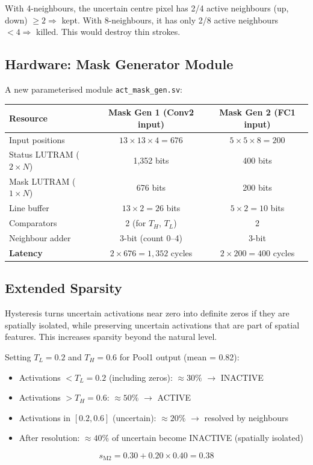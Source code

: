 \documentclass[11pt,a4paper]{article}
\begin{document}
With 4-neighbours, the uncertain centre pixel has 2/4 active neighbours
(up, down) $\geq 2 \Rightarrow$ kept. With 8-neighbours, it has only 2/8
active neighbours $< 4 \Rightarrow$ killed. This would destroy thin strokes.

\subsection{Hardware: Mask Generator Module}

A new parameterised module \texttt{act\_mask\_gen.sv}:

\begin{center}
\begin{tabular}{lcc}
\toprule
\textbf{Resource} & \textbf{Mask Gen 1} (Conv2 input) & \textbf{Mask Gen 2} (FC1 input) \\
\midrule
Input positions & $13\times13\times4 = 676$ & $5\times5\times8 = 200$ \\
Status LUTRAM ($2\times N$) & 1,352 bits & 400 bits \\
Mask LUTRAM ($1\times N$)  & 676 bits & 200 bits \\
Line buffer & $13\times2 = 26$ bits & $5\times2 = 10$ bits \\
Comparators & 2 (for $T_H$, $T_L$) & 2 \\
Neighbour adder & 3-bit (count 0--4) & 3-bit \\
\midrule
\textbf{Latency} & $2 \times 676 = 1{,}352$ cycles & $2 \times 200 = 400$ cycles \\
\bottomrule
\end{tabular}
\end{center}

\subsection{Extended Sparsity}

Hysteresis turns uncertain activations near zero into definite zeros if they
are spatially isolated, while preserving uncertain activations that are part
of spatial features.  This increases sparsity beyond the natural level.

Setting $T_L = 0.2$ and $T_H = 0.6$ for Pool1 output (mean = 0.82):
\begin{itemize}[nosep]
    \item Activations $< T_L = 0.2$ (including zeros): $\approx 30\%$ $\to$ INACTIVE
    \item Activations $> T_H = 0.6$: $\approx 50\%$ $\to$ ACTIVE
    \item Activations in $[0.2, 0.6]$ (uncertain): $\approx 20\%$ $\to$ resolved by neighbours
    \item After resolution: $\approx 40\%$ of uncertain become INACTIVE (spatially isolated)
\end{itemize}
\begin{equation}
s_{\text{M2}} = 0.30 + 0.20 \times 0.40 = 0.38
\end{equation}
\end{document}
